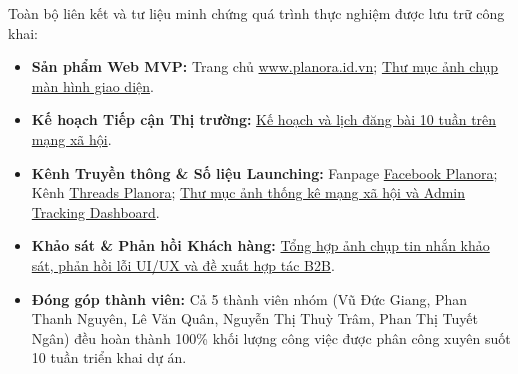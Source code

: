 \documentclass[11pt]{article}
\begin{document}
Toàn bộ liên kết và tư liệu minh chứng quá trình thực nghiệm được lưu trữ công khai:
\begin{itemize}
    \item \textbf{Sản phẩm Web MVP:} Trang chủ \href{https://www.planora.id.vn}{www.planora.id.vn}; \href{https://drive.google.com/drive/folders/17QFpvAA_m3wtimYPhKe0-bYMzgufKLp9?usp=sharing}{Thư mục ảnh chụp màn hình giao diện}.
    \item \textbf{Kế hoạch Tiếp cận Thị trường:} \href{https://docs.google.com/document/d/1fOqyDUOCmhLDXdhWGvPtCeUn_Bf0PoH7/edit?usp=sharing&ouid=114382309854651798971&rtpof=true&sd=true}{Kế hoạch và lịch đăng bài 10 tuần trên mạng xã hội}.
    \item \textbf{Kênh Truyền thông & Số liệu Launching:} Fanpage \href{https://www.facebook.com/profile.php?id=61594647060807}{Facebook Planora}; Kênh \href{https://www.threads.com/@planora.wedding}{Threads Planora}; \href{https://drive.google.com/drive/folders/1lo8-UoJkhtzMk1A9iy7E5t6sFk4E88OJ?usp=sharing}{Thư mục ảnh thống kê mạng xã hội và Admin Tracking Dashboard}.
    \item \textbf{Khảo sát & Phản hồi Khách hàng:} \href{https://drive.google.com/drive/folders/1xGcUkPfSd8J98-1XI5c4BPlAWIVGnC1m?usp=sharing}{Tổng hợp ảnh chụp tin nhắn khảo sát, phản hồi lỗi UI/UX và đề xuất hợp tác B2B}.
    \item \textbf{Đóng góp thành viên:} Cả 5 thành viên nhóm (Vũ Đức Giang, Phan Thanh Nguyên, Lê Văn Quân, Nguyễn Thị Thuỳ Trâm, Phan Thị Tuyết Ngân) đều hoàn thành 100\% khối lượng công việc được phân công xuyên suốt 10 tuần triển khai dự án.
\end{itemize}
\end{document}
